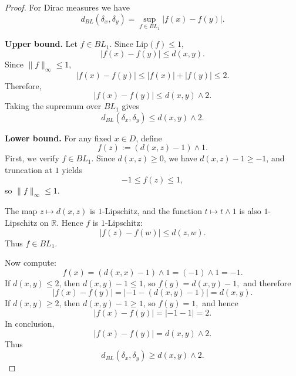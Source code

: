 \documentclass[12pt]{article}
\renewcommand{\(}{\left(}%
\renewcommand{\)}{\right)}%
\renewcommand{\[}{\left[}%
\renewcommand{\]}{\right]}%
\newtheorem{proof}{Proof.}}
\begin{document}
\begin{proof}
For Dirac measures we have
\begin{equation*}
d_{BL}(\delta_x,\delta_y)
=
\sup_{f \in BL_1} |f(x) - f(y)|.
\end{equation*}

\medskip
\noindent
\textbf{Upper bound.}
Let $f \in BL_1$. Since $\mathrm{Lip}(f) \le 1$,
\begin{equation*}
|f(x)-f(y)| \le d(x,y).
\end{equation*}
Since $\|f\|_\infty \le 1$,
\begin{equation*}
|f(x)-f(y)| \le |f(x)| + |f(y)| \le 2.
\end{equation*}
Therefore,
\begin{equation*}
|f(x)-f(y)| \le d(x,y) \wedge 2.
\end{equation*}
Taking the supremum over $BL_1$ gives
\begin{equation*}
d_{BL}(\delta_x,\delta_y)
\le
d(x,y) \wedge 2.
\end{equation*}

\medskip
\noindent
\textbf{Lower bound.}
For any fixed $x\in D$, define
\begin{equation*}
f(z) := (d(x,z) - 1) \wedge 1.
\end{equation*}
First, we verify $f \in BL_1$.
Since $d(x,z) \ge 0$, we have $d(x,z)-1 \ge -1$, and truncation at $1$ yields
\begin{equation*}
-1 \le f(z) \le 1,
\end{equation*}
so $\|f\|_\infty \le 1$.

The map $z \mapsto d(x,z)$ is $1$-Lipschitz, and the function
$t \mapsto t \wedge 1$ is also $1$-Lipschitz on $\mathbb{R}$.
Hence $f$ is $1$-Lipschitz:
\begin{equation*}
|f(z) - f(w)| \le d(z,w).
\end{equation*}
Thus $f \in BL_1$.

Now compute:
\begin{equation*}
f(x) = (d(x,x) - 1) \wedge 1 = (-1) \wedge 1 = -1.
\end{equation*}
If $d(x,y) \le 2$, then $d(x,y)-1 \le 1$, so $f(y) = d(x,y) - 1,$
and therefore
\begin{equation*}
|f(x)-f(y)|
=
|-1 - (d(x,y)-1)|
=
d(x,y).
\end{equation*}
If $d(x,y) \ge 2$, then $d(x,y)-1 \ge 1$, so $f(y) = 1,$
and hence
\begin{equation*}
|f(x)-f(y)|
=
|-1 - 1|
=
2.
\end{equation*}
In conclusion,
\begin{equation*}
|f(x)-f(y)| = d(x,y) \wedge 2.
\end{equation*}
Thus
\begin{equation*}
d_{BL}(\delta_x,\delta_y)
\ge
d(x,y) \wedge 2.
\end{equation*}
\end{proof}
\end{document}
